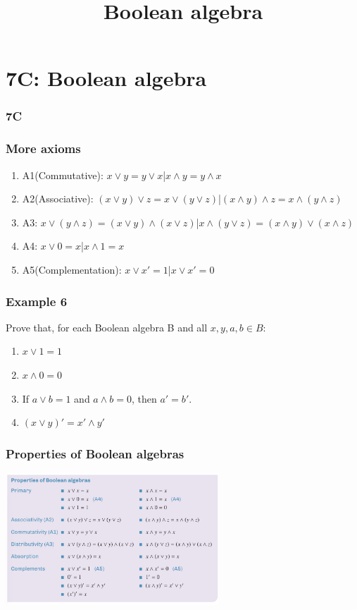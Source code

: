\documentclass[
	11pt, %
]{beamer}
\begin{document}
\section{7C: Boolean algebra}
\begin{frame}
    \frametitle{7C}
    \begin{center}
        \title{Boolean algebra}
        \maketitle
    \end{center}
\end{frame}

\begin{frame}
    \frametitle{More axioms}
    \begin{enumerate}
        \item A1(Commutative): $x \lor y = y \lor x$\quad|\quad$x \land y = y \land x$
        \item A2(Associative): $(x \lor y) \lor z = x \lor (y \lor z)$\quad|\quad$(x \land y) \land z = x \land (y \land z)$
        \item A3: $x \lor (y \land z) = (x \lor y) \land (x \lor z)$\quad|\quad$x \land (y \lor z) = (x \land y) \lor (x \land z)$
        \item A4: $x\lor 0 = x$\quad|\quad $x\land 1 = x$
        \item A5(Complementation): $x \lor x' = 1$\quad|\quad $x \lor x' = 0$
    \end{enumerate}
\end{frame}

\begin{frame}[t]
    \frametitle{Example 6}
    Prove that, for each Boolean algebra B and all $x,y,a,b\in B$:\\
    \begin{enumerate}
        \item $x \lor 1 = 1$
        \item $x \land 0 =0$
        \item If $a \lor b = 1$ and $a \land b = 0$, then $a'=b'$.
        \item $(x \lor y)' = x' \land y'$
    \end{enumerate}
\end{frame}
\begin{frame}
\end{frame}
\begin{frame}
    \frametitle{Properties of Boolean algebras}
    \begin{center}
        \includegraphics[width = 8cm]{Boolean.png}
    \end{center}
\end{frame}
\end{document}

